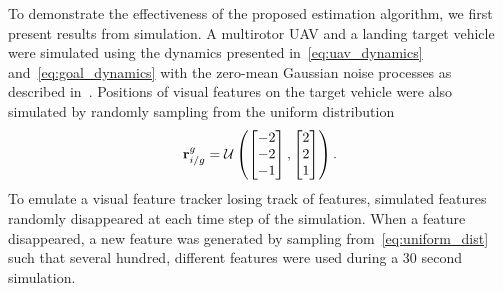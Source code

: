 
To demonstrate the effectiveness of the proposed estimation algorithm, we first
present results from simulation.
A multirotor UAV and a landing target vehicle were simulated using the dynamics presented
in~\eqref{eq:uav_dynamics} and~\eqref{eq:goal_dynamics} with the zero-mean
Gaussian noise processes as described
in~.
Positions of visual features on the target vehicle
were also simulated by randomly sampling from the uniform distribution
\begin{equation}
  \boldsymbol{\mathrm{r}}_{i/g}^g = \mathcal{U}
  \left( \begin{bmatrix} -2 \\ -2 \\ -1 \end{bmatrix},
  \begin{bmatrix} 2 \\ 2 \\ 1 \end{bmatrix} \right).
  \label{eq:uniform_dist}
\end{equation}
To emulate a visual feature tracker losing track of features, simulated features
randomly disappeared at each time step of the simulation.
When a feature disappeared, a new feature was generated by sampling
from~\eqref{eq:uniform_dist}
such that several
hundred, different features were used during a 30 second simulation.

